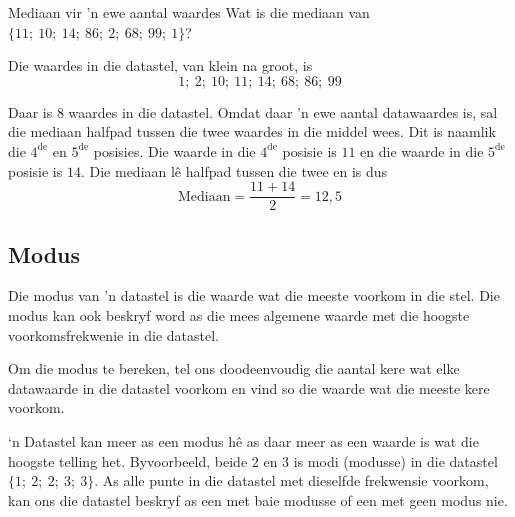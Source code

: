 \begin{wex}{Mediaan vir 'n ewe aantal waardes}
{Wat is die mediaan van $\{11;\ 10;\ 14;\ 86;\ 2;\ 68;\ 99;\ 1\}$?}
{

  Die waardes in die datastel, van klein na groot, is
  \begin{equation*}
    1;\ 2;\ 10;\ 11;\ 14;\ 68;\ 86;\ 99
  \end{equation*}


  Daar is $8$ waardes in die datastel. Omdat daar 'n ewe aantal datawaardes is, sal die mediaan halfpad tussen die twee waardes in die middel wees. Dit is naamlik die $4^{\mathrm{de}}$ en $5^{\mathrm{de}}$ posisies. Die waarde in die 
  $4^{\mathrm{de}}$ posisie is $11$ en die waarde in die $5^{\mathrm{de}}$ posisie is
  $14$. Die mediaan l\^e halfpad tussen die twee en is dus
  \begin{equation*}
    \mbox{Mediaan} = \frac{11+14}{2} = 12,5
  \end{equation*}
}
\end{wex}

\subsection{Modus}
{Die modus van 'n datastel is die waarde wat die meeste voorkom in die stel. Die modus kan ook beskryf word as die mees algemene waarde met die hoogste voorkomsfrekwenie in die datastel.}

Om die modus te bereken, tel ons doodeenvoudig die aantal kere wat elke datawaarde in die datastel voorkom en vind so die waarde wat die meeste kere voorkom.\par

‘n Datastel kan meer as een modus hê as daar meer as een waarde is wat die hoogste telling het. Byvoorbeeld, beide $2$ en $3$ is modi (modusse) in die datastel $\{1;\ 2;\ 2;\ 3;\ 3\}$. As alle punte in die datastel met dieselfde frekwensie voorkom, kan ons die datastel beskryf as een met baie modusse of een met geen modus nie. 

